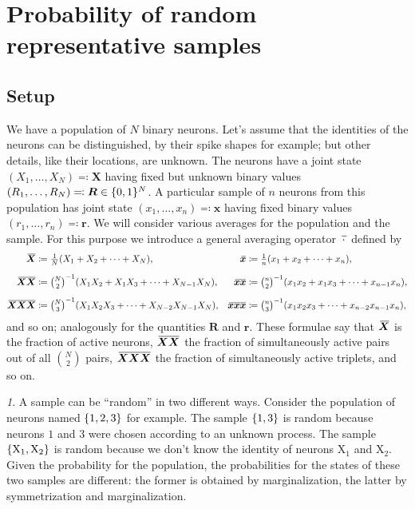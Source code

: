 \documentclass{article}
\theoremstyle{remark}
\theoremstyle{innote}
\newcommand*{\defd}{\coloneqq}
\newcommand*{\defs}{\eqqcolon}
\renewcommand*{\|}{\mathpunct{|}}%
\newcommand*{\dotv}{\mathord{\,\cdot\,}}%
\DeclarePairedDelimiter\set{\{}{\}}
\theoremstyle{simple}
\newtheorem*{simplenote}{}
\newcommand*{\widebar}[1]{{\mkern1.5mu\skew{2}\overline{\mkern-1.5mu#1\mkern-1.5mu}\mkern 1.5mu}}
\newcommand*{\av}{\widebar} %
\newcommand*{\sav}{\widebar} %
\newcommand*{\yxx}{x}%
\newcommand*{\yx}{\bm{\yxx}}%
\newcommand*{\yX}{\bm{X}}%
\newcommand*{\yXf}{\av{\yX}}%
\newcommand*{\yXXf}{\av{\yX\yX}}%
\newcommand*{\yr}{\bm{r}}%
\newcommand*{\yR}{\bm{R}}%
\begin{document}
\section{Probability of random representative samples}
\label{sec:prob_samples}

\subsection{Setup}
\label{sec:setup}

We have a population of $N$ binary neurons. Let's assume that the
identities of the neurons can be distinguished, by their spike shapes for
example; but other details, like their locations, are unknown. The neurons
have a joint state $(X_1,\dotsc,X_N) \defs \yX$ having fixed but unknown
binary values $(R_1,\dotsc,R_N)\defs \yR \in \set{0,1}^N$. A particular
sample of $n$ neurons from this population has joint state
$(x_1, \dotsc, x_n) \defs \yx$ having fixed binary values
$(r_1, \dotsc, r_n)\defs\yr$. We will consider various averages for the
population and the sample. For this purpose we introduce a general
averaging operator $\sav{\dotv}$ defined by
\begin{align}
  \av{\yX}  &\defd \tfrac{1}{N} (X_1 + X_2 + \dotsb + X_N),
  &
  \sav{\yx}  &\defd \tfrac{1}{n} (x_1 + x_2 + \dotsb + x_n),
    \\[2\jot]
  \av{\yX \yX} &\defd
\tbinom{N}{2}^{-1} (X_1 X_2 + X_1 X_3  + \dotsb +  X_{N-1} X_N),
  &
    \sav{\yx \yx} &\defd
\tbinom{n}{2}^{-1} (x_1 x_2 + x_1 x_3  + \dotsb +  x_{n-1} x_n),
\\[2\jot]
\av{\yX\yX\yX} &\defd
                  \tbinom{N}{3}^{-1}
                  (X_1 X_2 X_3 +%
                   \dotsb + X_{N-2} X_{N-1}X_N),
  &
    \sav{\yx\yx\yx} &\defd
                      \tbinom{n}{3}^{-1} (x_1 x_2 x_3 + %
                       \dotsb + x_{n-2} x_{n-1} x_n),
\end{align}
and so on; analogously for the quantities $\yR$ and $\yr$. These formulae
say that $\yXf$ is the fraction of active neurons, $\yXXf$ the fraction of
simultaneously active pairs out of all $\binom{N}{2}$ pairs, $\av{\yX\yX\yX}$
the fraction of simultaneously active triplets, and so on.



\begin{simplenote}
  A sample can be \enquote{random} in two different ways. Consider the
  population of neurons named $\set{1,2,3}$ for example. The sample
  $\set{1,3}$ is random because neurons $1$ and $3$ were chosen according
  to an unknown process. The sample $\set{\textrm{X}_1, \textrm{X}_2}$ is
  random because we don't know the identity of neurons $\textrm{X}_1$ and
  $\textrm{X}_2$. Given the probability for the population, the
  probabilities for the states of these two samples are different: the
  former is obtained by marginalization, the latter by symmetrization and
  marginalization.
\end{simplenote}
\end{document}
